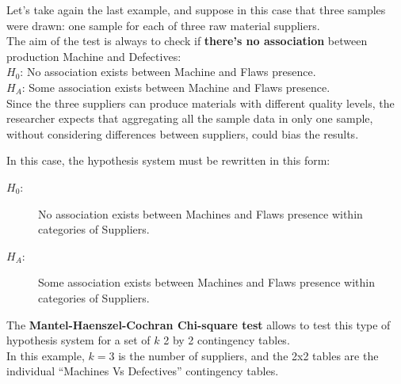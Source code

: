 
\begin{frame}
  \vspace{.25cm}
  Let's take again the last example, and suppose in this case that three samples were drawn: one sample for each of three raw material suppliers.\\
  \vspace{.25cm}
  The aim of the test is always to check if \textbf{there's no association} between production Machine and Defectives:\\
  \vspace{.25cm}
  $H_0$: No association exists between Machine and Flaws presence.\\
  $H_A$: Some association exists between Machine and Flaws presence.\\
  \vspace{.25cm}
  Since the three suppliers can produce materials with different quality levels, the researcher expects that aggregating all the sample data in only one sample, without considering differences between suppliers, could bias the results.
\end{frame}

\begin{frame}
  \vspace{.25cm}
  In this case, the hypothesis system must be rewritten in this form:\\
  \vspace{.25cm}
  \begin{description}
   \item[$H_0$:] No association exists between Machines and Flaws presence within categories of Suppliers.
   \item[$H_A$:] Some association exists between Machines and Flaws presence within categories of Suppliers.\\
   \end{description}
  \vspace{.25cm}
  The \textbf{Mantel-Haenszel-Cochran Chi-square test} allows to test this type of hypothesis system for a set of $k$ 2 by 2 contingency tables.\\
  \vspace{.25cm}
  In this example, $k=3$ is the number of suppliers, and the 2x2 tables are the individual ``Machines Vs Defectives'' contingency tables.
\end{frame}


